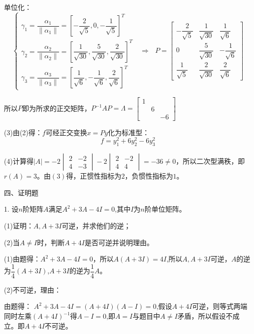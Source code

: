 \documentclass{article}
\begin{document}
\begin{jie}
单位化：
\begin{equation*}
\begin{cases}
\gamma_1=\dfrac{\alpha_1}{\|\alpha_1\|}=\left[-\dfrac{2}{\sqrt{5}},0,-\dfrac{1}{\sqrt{5}}\right]^T\\[2mm]
\gamma_2=\dfrac{\alpha_2}{\|\alpha_2\|}=\left[\dfrac{1}{\sqrt{30}},\dfrac{5}{\sqrt{30}},\dfrac{2}{\sqrt{30}}\right]^T\\[2mm]
\gamma_3=\dfrac{\alpha_3}{\|\alpha_3\|}=\left[\dfrac{1}{\sqrt{6}},-\dfrac{1}{\sqrt{6}},\dfrac{2}{\sqrt{6}}\right]^T
\end{cases}~~~\Rightarrow~~~P=
\begin{bmatrix}
-\dfrac{2}{\sqrt{5}}&\dfrac{1}{\sqrt{30}}&\dfrac{1}{\sqrt{6}}\\[2mm]
0&\dfrac{5}{\sqrt{30}}&-\dfrac{1}{\sqrt{6}}\\[2mm]
\dfrac{1}{\sqrt{5}}&\dfrac{2}{\sqrt{30}}&\dfrac{2}{\sqrt{6}}
\end{bmatrix}
\end{equation*}

所以$P$即为所求的正交矩阵，$P^{-1}AP=\Lambda=
\begin{bmatrix}
  1 & & \\
    & 6&\\
    &&-6
\end{bmatrix}$

(3)由(2)得：$f$可经正交变换$x=Py$化为标准型：
\begin{equation*}
  f=y_{1}^2+6y_{2}^2-6y_{3}^2
\end{equation*}

(4)计算得$|A|=
-2\begin{vmatrix}
    2 & -2 \\
   4 & -3
  \end{vmatrix}-2\begin{vmatrix}
    2 & -2 \\
   4 & 4
  \end{vmatrix}=-36\neq0
$，所以二次型满秩，即$r(A)=3$。由$(3)$得，正惯性指标为$2$，负惯性指标为$1$。
\end{jie}

四、证明题

1. 设$n$阶矩阵$A$满足$A^{2}+3A-4I=0$,其中$I$为$n$阶单位矩阵。

(1)证明：$A,A+3I$可逆，并求他们的逆；

(2)当$A\neq I$时，判断$A+4I$是否可逆并说明理由。

\begin{jie}
(1)由题得：$A^{2}+3A-4I=0$，所以$A(A+3I)=4I$,所以$A,A+3I$可逆，$A$的逆为$\dfrac{1}{4}(A+3I)$,$A+3I$的逆为$\dfrac{1}{4}A$。

(2)不可逆，理由：

由题得：
$A^{2}+3A-4I=(A+4I)(A-I)=0$,假设$A+4I$可逆，则等式两端同时左乘$(A+4I)^{-1}$得$A-I=0$,即$A=I$与题目中$A\neq I$矛盾，所以假设不成立。即$A+4I$不可逆。
\end{jie}
\end{document}

